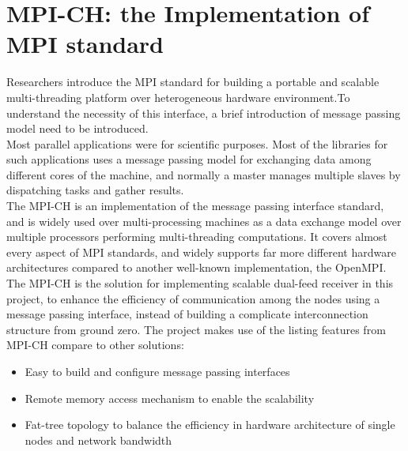 \documentclass[11pt,openright,a4paper]{report}
\begin{document}
\section{MPI-CH: the Implementation of MPI standard}
Researchers introduce the MPI standard for building a portable and scalable multi-threading platform over heterogeneous hardware environment\cite{dongarra1995introduction}.To understand the necessity of this interface, a brief introduction of message passing model need to be introduced.\\
Most parallel applications were for scientific purposes\cite{kendall_2016}. Most of the libraries for such applications uses a message passing model for exchanging data among different cores of the machine, and normally a master manages multiple slaves by dispatching tasks and gather results.\\
The MPI-CH is an implementation of the message passing interface standard, and is widely used over multi-processing machines as a data exchange model over multiple processors performing multi-threading computations. It covers almost every aspect of MPI standards, and widely supports far more different hardware architectures compared to another well-known implementation, the OpenMPI.\\
The MPI-CH is the solution for implementing scalable dual-feed receiver in this project, to enhance the efficiency of communication among the nodes using a message passing interface, instead of building a complicate interconnection structure from ground zero. The project makes use of the listing features from MPI-CH compare to other solutions:
\begin{itemize}
	\item Easy to build and configure message passing interfaces
	\item Remote memory access mechanism to enable the scalability
	\item Fat-tree topology to balance the efficiency in hardware architecture of single nodes and network bandwidth
\end{itemize} 
\end{document}
